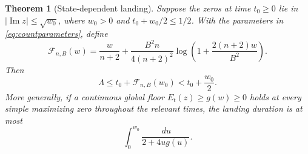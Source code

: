 \documentclass[11pt]{article}
\numberwithin{equation}{section}
\newtheorem{theorem}{Theorem}[section]
\theoremstyle{definition}
\theoremstyle{remark}
\DeclareMathOperator{\Ima}{Im}
\newcommand{\dd}{\,d}
\begin{document}
\begin{theorem}[State-dependent landing]\label{thm:landing}
Suppose the zeros at time $t_0\ge0$ lie in $|\Ima z|\le\sqrt{w_0}$,
where $w_0>0$ and $t_0+w_0/2\le1/2$. With the parameters in
\eqref{eq:countparameters}, define
\begin{equation}\label{eq:landingfunction}
 \mathcal F_{n,B}(w)=\frac{w}{n+2}
 +\frac{B^2n}{4(n+2)^2}\log\left(1+\frac{2(n+2)w}{B^2}\right).
\end{equation}
Then
\begin{equation}\label{eq:landingbound}
 \Lambda\le t_0+\mathcal F_{n,B}(w_0)<t_0+\frac{w_0}{2}.
\end{equation}
More generally, if a continuous global floor $E_t(z)\ge g(w)\ge0$
holds at every simple maximizing zero throughout the relevant times,
the landing duration is at most
\begin{equation}\label{eq:generallanding}
 \int_0^{w_0}\frac{\dd u}{2+4u g(u)}.
\end{equation}
\end{theorem}
\end{document}
